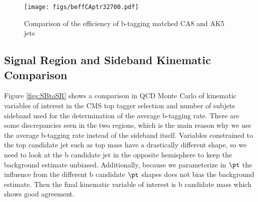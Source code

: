 \begin{figure}[Htcb]
\centering
\texttt{[image: figs/beffCAptr32700.pdf]}
\caption{Comparison of the efficiency of b-tagging matched CA8 and AK5 jets}
\label{figs:beff}
\end{figure}






\subsection{Signal Region and Sideband Kinematic Comparison}
\label{sec:SBvsSR}
Figure \ref{figs:SBtoSR} shows a comparison in QCD Monte Carlo of kinematic variables of interest in the CMS top tagger selection and number of subjets sideband used for the determination of the average b-tagging rate.  There are some discrepancies 
seen in the two regions, which is the main reason why we use the average b-tagging rate instead of the sideband itself.  Variables constrained to the top candidate jet such as top mass have a drastically different shape, so we need to look at the 
b candidate jet in the opposite hemisphere to keep the background estimate unbiased.  Additionally, because we parameterize in $\pt$ the influence from the different b candidate $\pt$ shapes does not bias the background estimate.  Then the final 
kinematic variable of interest is b candidate mass which shows good agreement.  


